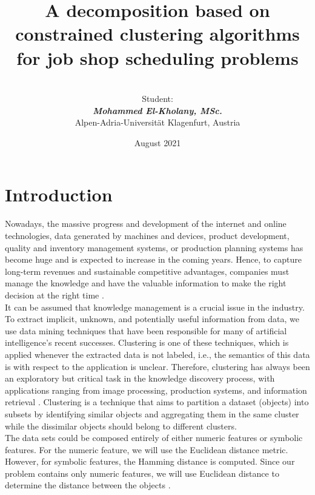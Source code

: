 \documentclass{article}
\title{\textbf{A decomposition based on constrained clustering algorithms for job shop scheduling problems} \\}
\author{\\[1in] Student: \\ \textit{\textbf{Mohammed El-Kholany, MSc.}}\\Alpen-Adria-Universität Klagenfurt, Austria \\[3in] }
\date{August 2021}
\newcommand{\comment}[1]{\todo[inline]{#1}}
\begin{document}
\clearpage\maketitle
\thispagestyle{empty}
\clearpage
\setcounter{page}{1}
\newpage
\section{Introduction}
Nowadays, the massive progress and development of the internet and online technologies, data generated by machines and devices, product development, quality and inventory management systems, or production planning systems has become huge and is expected to increase in the coming years. Hence, to capture long-term revenues and sustainable competitive advantages, companies must manage the knowledge and have the valuable information to make the right decision at the right time \cite{benabdellah2019survey}. \\

It can be assumed that knowledge management is a crucial issue in the industry. To extract implicit, unknown, and potentially useful information from data, we use data mining techniques that have been responsible for many of artificial intelligence’s recent successes. 
Clustering is one of these techniques, which is applied whenever the extracted data is not labeled, i.e., the semantics of this data is with respect to the application is unclear. Therefore, clustering has always been an exploratory but critical task in the knowledge discovery process, with applications ranging from image processing, production systems, and information retrieval \cite{benabdellah2019survey}. Clustering is a technique that aims to partition a dataset (objects) into subsets by identifying similar objects and aggregating them in the same cluster while the dissimilar objects should belong to different clusters.\\

The data sets could be composed entirely of either numeric features or symbolic features. For the numeric feature, we will use the Euclidean distance metric. However, for symbolic features, the Hamming distance is computed. Since our problem contains only numeric features, we will use Euclidean distance to determine the distance between the objects \cite{aloise2009np, wagstaff2001constrained,macqueen1967some}.\\
\end{document}
